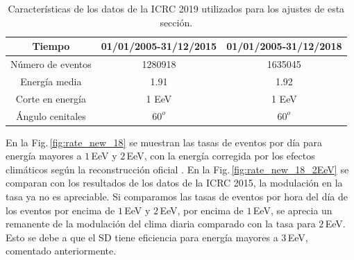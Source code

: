 			\begin{table}[H]
				\centering
				\begin{tabular}{|c|c|c|}
				\hline
				\textbf{Tiempo }    & \textbf{01/01/2005-31/12/2015}  & \textbf{01/01/2005-31/12/2018 }\\ \hline 
				Número de eventos   &  1280918     			 &  1635045     		 \\ \hline 
				Energía media       &  1.91				 &	1.92				\\ \hline %
				Corte en energía    &  1 EeV       		 	 &  1 EeV       		 \\ \hline 
				Ángulo cenitales	&  $60^o$ 				 & $60^o$\\ \hline
				\end{tabular}
				\caption{Características de los datos de la ICRC 2019 utilizados para los ajustes de esta sección.} \label{tabla:caracteristicas_ICRC_2019}
			\end{table}

			En la Fig.\,\ref{fig:rate_new_18} se muestran las tasas de eventos por día para energía mayores a $1\,$EeV y $2\,$EeV, con la energía corregida por los efectos climáticos según la reconstrucción oficial \cite{data}. En la Fig.\,\ref{fig:rate_new_18_2EeV} se  comparan con los resultados de los datos de la ICRC 2015, la modulación en la tasa ya no es apreciable. Si comparamos las tasas de eventos por hora del día de los eventos por encima de $1\,$EeV y $2\,$EeV, por encima de $1\,$EeV, se aprecia un remanente de la modulación del clima diaria comparado con la tasa para $2\,$EeV. Esto se debe a que el SD tiene eficiencia para energía mayores a $3\,$EeV, comentado anteriormente.


